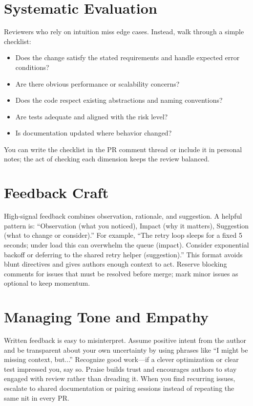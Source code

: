 \section{Systematic Evaluation}
Reviewers who rely on intuition miss edge cases. Instead, walk through a simple checklist:
\begin{itemize}
  \item Does the change satisfy the stated requirements and handle expected error conditions?
  \item Are there obvious performance or scalability concerns?
  \item Does the code respect existing abstractions and naming conventions?
  \item Are tests adequate and aligned with the risk level?
  \item Is documentation updated where behavior changed?
\end{itemize}
You can write the checklist in the PR comment thread or include it in personal notes; the act of checking each dimension keeps the review balanced.

\section{Feedback Craft}
High-signal feedback combines observation, rationale, and suggestion. A helpful pattern is: ``Observation (what you noticed), Impact (why it matters), Suggestion (what to change or consider).'' For example, ``The retry loop sleeps for a fixed 5 seconds; under load this can overwhelm the queue (impact). Consider exponential backoff or deferring to the shared retry helper (suggestion).'' This format avoids blunt directives and gives authors enough context to act. Reserve blocking comments for issues that must be resolved before merge; mark minor issues as optional to keep momentum.

\section{Managing Tone and Empathy}
Written feedback is easy to misinterpret. Assume positive intent from the author and be transparent about your own uncertainty by using phrases like ``I might be missing context, but...'' Recognize good work---if a clever optimization or clear test impressed you, say so. Praise builds trust and encourages authors to stay engaged with review rather than dreading it. When you find recurring issues, escalate to shared documentation or pairing sessions instead of repeating the same nit in every PR.

